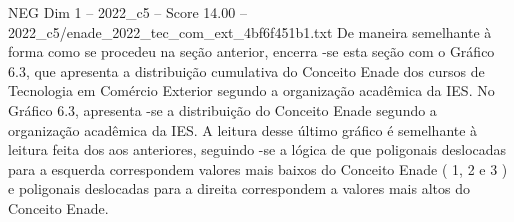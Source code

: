 \begin{textsample}{NEG Dim 1 – 2022\_c5 – Score 14.00 – 2022\_c5/enade\_2022\_tec\_com\_ext\_4bf6f451b1.txt}
De maneira semelhante à forma como se procedeu na seção anterior, encerra -se esta seção com o Gráfico 6.3, que apresenta a distribuição cumulativa do Conceito Enade dos cursos de Tecnologia em Comércio Exterior segundo a organização acadêmica da IES.
No Gráfico 6.3, apresenta -se a distribuição do Conceito Enade segundo a organização acadêmica da IES.
A leitura desse último gráfico é semelhante à leitura feita dos aos anteriores, seguindo -se a lógica de que poligonais deslocadas para a esquerda correspondem valores mais baixos do Conceito Enade ( 1, 2 e 3 ) e poligonais deslocadas para a direita correspondem a valores mais altos do Conceito Enade.

\end{textsample}

